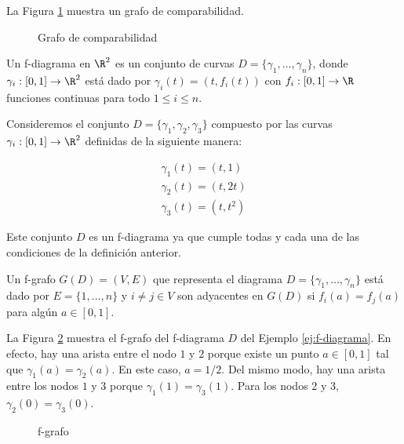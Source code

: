 \begin{ejemplo}
La Figura \ref{fig:grafo_comparabilidad} muestra un grafo de comparabilidad.

\begin{figure}[htb]
\centering
\ejemplografocomparabilidad
\caption{Grafo de comparabilidad}
\label{fig:grafo_comparabilidad}
\end{figure}
\end{ejemplo}

\begin{defi}
Un f-diagrama en $\R^2$ es un conjunto de curvas $D = \{\gamma_1,\dots, \gamma_n \}$, donde $\gamma_i : [0,1] \to \R^2$ está dado por $\gamma_i(t) = (t, f_i(t))$ con $f_i : [0,1] \to \R$ funciones continuas para todo $1 \leq i \leq n$.
\end{defi}

\begin{ejemplo} \label{ej:f-diagrama}
Consideremos el conjunto $D = \{\gamma_1, \gamma_2, \gamma_3\}$ compuesto por las curvas $\gamma_i : [0,1] \to \R^2$ definidas de la siguiente manera:

\begin{eqnarray*}
\gamma_1(t) = (t,1)\\
\gamma_2(t) = (t,2t)\\
\gamma_3(t) = (t, t^2)
\end{eqnarray*}

Este conjunto $D$ es un f-diagrama ya que cumple todas y cada una de las condiciones de la definición anterior.

\end{ejemplo}

\begin{defi}
Un f-grafo $G(D) = (V,E)$ que representa el diagrama $D = \{\gamma_1,\dots, \gamma_n \}$ está dado por $E = \{1,\dots, n\}$ y $i \neq j \in V$ son adyacentes en $G(D)$ si $f_i(a) = f_j(a)$ para algún $a \in [0,1]$.
\end{defi}

\begin{ejemplo}
La Figura \ref{fig:f-grafo} muestra el f-grafo del f-diagrama $D$ del Ejemplo \ref{ej:f-diagrama}. En efecto, hay una arista entre el nodo $1$ y $2$ porque existe un punto $a \in [0,1]$ tal que $\gamma_1(a) = \gamma_2(a)$. En este caso, $a = 1/2$. Del mismo modo, hay una arista entre los nodos $1$ y $3$ porque $\gamma_1(1) = \gamma_3(1)$. Para los nodos $2$ y $3$, $\gamma_2(0) = \gamma_3(0)$. 

\begin{figure}[htb]
\centering
\ejemplogfgrafo
\caption{f-grafo}
\label{fig:f-grafo}
\end{figure}
\end{ejemplo}

